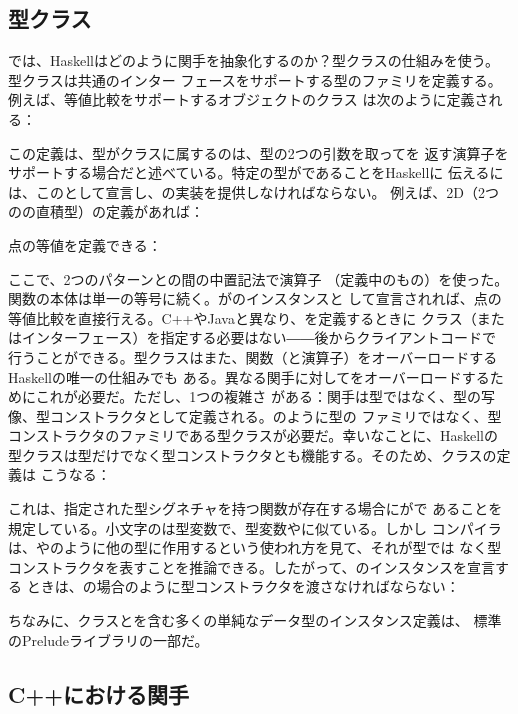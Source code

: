 \subsection{型クラス}

では、Haskellはどのように関手を抽象化するのか？型クラスの仕組みを使う。型クラスは共通のインター
フェースをサポートする型のファミリを定義する。例えば、等値比較をサポートするオブジェクトのクラス
は次のように定義される：

この定義は、型がクラスに属するのは、型の2つの引数を取ってを
返す演算子\code{(==)}をサポートする場合だと述べている。特定の型がであることをHaskellに
伝えるには、このとして宣言し、\code{(==)}の実装を提供しなければならない。
例えば、2D（2つのの直積型）の定義があれば：

点の等値を定義できる：

ここで、2つのパターンとの間の中置記法で演算子\code{(==)}
（定義中のもの）を使った。関数の本体は単一の等号に続く。がのインスタンスと
して宣言されれば、点の等値比較を直接行える。C++やJavaと異なり、を定義するときに
クラス（またはインターフェース）を指定する必要はない――後からクライアントコードで
行うことができる。型クラスはまた、関数（と演算子）をオーバーロードするHaskellの唯一の仕組みでも
ある。異なる関手に対してをオーバーロードするためにこれが必要だ。ただし、1つの複雑さ
がある：関手は型ではなく、型の写像、型コンストラクタとして定義される。のように型の
ファミリではなく、型コンストラクタのファミリである型クラスが必要だ。幸いなことに、Haskellの
型クラスは型だけでなく型コンストラクタとも機能する。そのため、クラスの定義は
こうなる：

これは、指定された型シグネチャを持つ関数が存在する場合にがで
あることを規定している。小文字のは型変数で、型変数やに似ている。しかし
コンパイラは、やのように他の型に作用するという使われ方を見て、それが型では
なく型コンストラクタを表すことを推論できる。したがって、のインスタンスを宣言する
ときは、の場合のように型コンストラクタを渡さなければならない：

ちなみに、クラスとを含む多くの単純なデータ型のインスタンス定義は、
標準のPreludeライブラリの一部だ。

\subsection{C++における関手}

